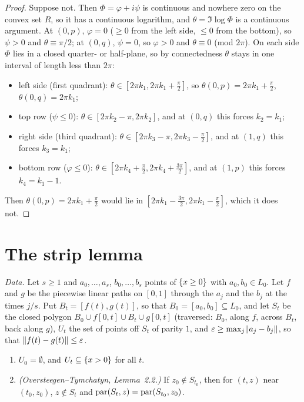 \begin{proof}
Suppose not. Then $\Phi=\varphi+i\psi$ is continuous and nowhere zero on the convex set $R$, so it has a continuous logarithm, and $\theta=\Im\log\Phi$ is a
continuous argument. At $(0,p)$, $\varphi=0$ ($\ge0$ from the left side, $\le0$ from the bottom), so $\psi>0$ and $\theta\equiv\pi/2$; at $(0,q)$, $\psi=0$, so
$\varphi>0$ and $\theta\equiv0$ (mod $2\pi$). On each side $\Phi$ lies in a closed quarter- or half-plane, so by connectedness $\theta$ stays in one interval of
length less than $2\pi$:
\begin{itemize}
\item left side (first quadrant): $\theta\in[2\pi k_1,2\pi k_1+\frac\pi2]$, so $\theta(0,p)=2\pi k_1+\frac\pi2$, $\theta(0,q)=2\pi k_1$;
\item top row ($\psi\le0$): $\theta\in[2\pi k_2-\pi,2\pi k_2]$, and at $(0,q)$ this forces $k_2=k_1$;
\item right side (third quadrant): $\theta\in[2\pi k_3-\pi,2\pi k_3-\frac\pi2]$, and at $(1,q)$ this forces $k_3=k_1$;
\item bottom row ($\varphi\le0$): $\theta\in[2\pi k_4+\frac\pi2,2\pi k_4+\frac{3\pi}2]$, and at $(1,p)$ this forces $k_4=k_1-1$.
\end{itemize}
Then $\theta(0,p)=2\pi k_1+\frac\pi2$ would lie in $[2\pi k_1-\frac{3\pi}2,2\pi k_1-\frac\pi2]$, which it does not.
\end{proof}


\section{The strip lemma}

\emph{Data.} Let $s\ge1$ and $a_0,\dots,a_s$, $b_0,\dots,b_s$ points of $\left\{ x\ge0 \right\}$ with $a_0,b_0\in L_0$. Let $f$ and $g$ be the piecewise linear paths on
$[0,1]$ through the $a_j$ and the $b_j$ at the times $j/s$. Put $B_t=[f(t),g(t)]$, so that $B_0=[a_0,b_0]\subseteq L_0$, and let $S_t$ be the closed polygon
$B_0\cup f[0,t]\cup B_t\cup g[0,t]$ (traversed: $B_0$, along $f$, across $B_t$, back along $g$), $U_t$ the set of points off $S_t$ of parity $1$, and $\varepsilon\ge\max_j\lVert a_j-b_j\rVert$,
so that $\lVert f(t)-g(t)\rVert\le\varepsilon$.


\begin{lemma}\label{lem:strip-basic}
\leavevmode
\begin{enumerate}[label=(\alph*)]
\item $U_0=\emptyset$, and $U_t\subseteq\left\{ x>0 \right\}$ for all $t$.
\item \emph{(Oversteegen--Tymchatyn, Lemma~2.2.)} If $z_0\notin S_{t_0}$, then for $(t,z)$ near $(t_0,z_0)$, $z\notin S_t$ and $\operatorname{par}(S_t,z)=\operatorname{par}(S_{t_0},z_0)$.
\end{enumerate}
\end{lemma}


